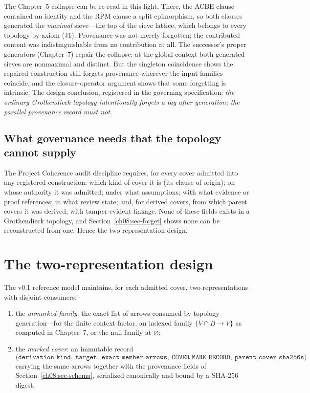 \begin{remark}\label{ch08:rem-legacy-extreme}
The Chapter~5 collapse can be re-read in this light. There, the ACBE clause contained an identity and the RPM clause a split epimorphism, so both clauses generated the \emph{maximal} sieve---the top of the sieve lattice, which belongs to every topology by axiom (J1). Provenance was not merely forgotten; the contributed content was indistinguishable from no contribution at all. The successor's proper generators (Chapter~7) repair the collapse: at the global context both generated sieves are nonmaximal and distinct. But the singleton coincidence shows the repaired construction still forgets provenance wherever the input families coincide, and the closure-operator argument shows that some forgetting is intrinsic. The design conclusion, registered in the governing specification: \emph{the ordinary Grothendieck topology intentionally forgets a tag after generation; the parallel provenance record must not.}
\end{remark}

\subsection{What governance needs that the topology cannot supply}

The Project Coherence audit discipline requires, for every cover admitted into any registered construction: which kind of cover it is (its clause of origin); on whose authority it was admitted; under what assumptions; with what evidence or proof references; in what review state; and, for derived covers, from which parent covers it was derived, with tamper-evident linkage. None of these fields exists in a Grothendieck topology, and Section~\ref{ch08:sec-forget} shows none can be reconstructed from one. Hence the two-representation design.

\section{The two-representation design}\label{ch08:sec-two-reps}

\begin{construction}\label{ch08:con-two-reps}
The v0.1 reference model maintains, for each admitted cover, two representations with disjoint consumers:
\begin{enumerate}
\item the \emph{unmarked family}: the exact list of arrows consumed by topology generation---for the finite context factor, an indexed family $\{V\cap B\to V\}$ as computed in Chapter~7, or the null family at $\varnothing$;
\item the \emph{marked cover}: an immutable record
\[
\bigl(\texttt{derivation\_kind},\ \texttt{target},\ \texttt{exact\_member\_arrows},\ \texttt{COVER\_MARK\_RECORD},\ \texttt{parent\_cover\_sha256s}\bigr)
\]
carrying the same arrows together with the provenance fields of Section~\ref{ch08:sec-schema}, serialized canonically and bound by a SHA-256 digest.
\end{enumerate}
\end{construction}

